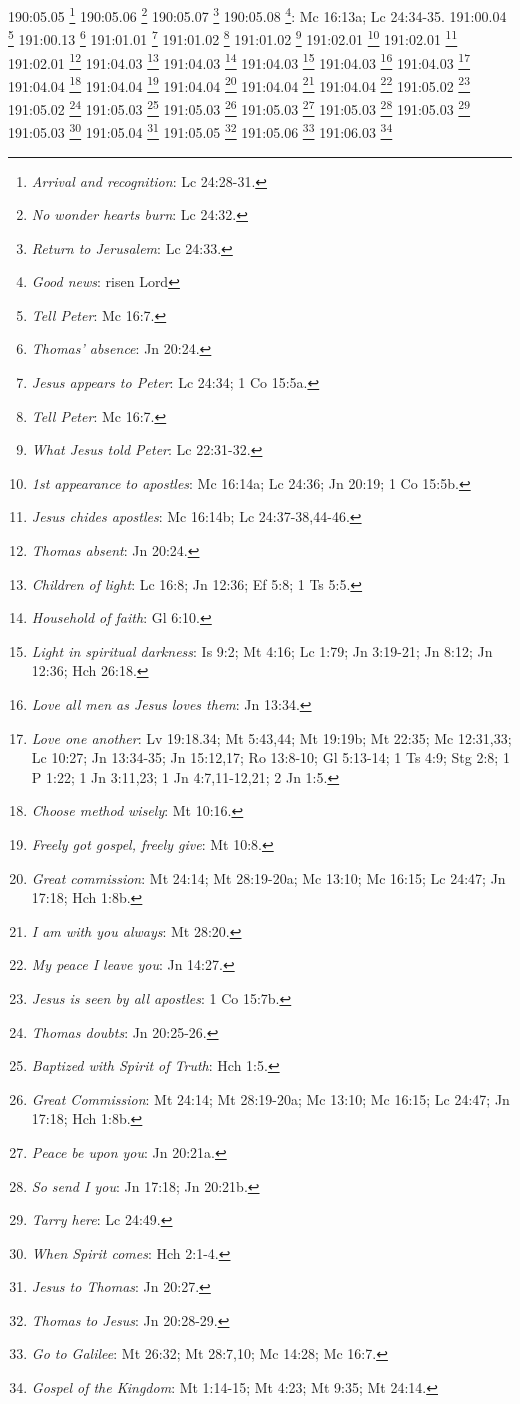 {{{{{{{{{{{{{{{{{{{{{{{{{{{{{{{{{{{{{{{{{{{{{{{{{{{{{{{{{{{{{{{{{{{{{{{{{{{{{{{{{{{{{{{{{{{{{{{{190:05.05 \footnote{\textit{Arrival and recognition}: Lc 24:28-31.}
190:05.06 \footnote{\textit{No wonder hearts burn}: Lc 24:32.}
190:05.07 \footnote{\textit{Return to Jerusalem}: Lc 24:33.}
190:05.08 \footnote{\textit{Good news}: risen Lord}: Mc 16:13a; Lc 24:34-35.}
191:00.04 \footnote{\textit{Tell Peter}: Mc 16:7.}
191:00.13 \footnote{\textit{Thomas' absence}: Jn 20:24.}
191:01.01 \footnote{\textit{Jesus appears to Peter}: Lc 24:34; 1 Co 15:5a.}
191:01.02 \footnote{\textit{Tell Peter}: Mc 16:7.}
191:01.02 \footnote{\textit{What Jesus told Peter}: Lc 22:31-32.}
191:02.01 \footnote{\textit{1st appearance to apostles}: Mc 16:14a; Lc 24:36; Jn 20:19; 1 Co 15:5b.}
191:02.01 \footnote{\textit{Jesus chides apostles}: Mc 16:14b; Lc 24:37-38,44-46.}
191:02.01 \footnote{\textit{Thomas absent}: Jn 20:24.}
191:04.03 \footnote{\textit{Children of light}: Lc 16:8; Jn 12:36; Ef 5:8; 1 Ts 5:5.}
191:04.03 \footnote{\textit{Household of faith}: Gl 6:10.}
191:04.03 \footnote{\textit{Light in spiritual darkness}: Is 9:2; Mt 4:16; Lc 1:79; Jn 3:19-21; Jn 8:12; Jn 12:36; Hch 26:18.}
191:04.03 \footnote{\textit{Love all men as Jesus loves them}: Jn 13:34.}
191:04.03 \footnote{\textit{Love one another}: Lv 19:18.34; Mt 5:43,44; Mt 19:19b; Mt 22:35; Mc 12:31,33; Lc 10:27; Jn 13:34-35; Jn 15:12,17; Ro 13:8-10; Gl 5:13-14; 1 Ts 4:9; Stg 2:8; 1 P 1:22; 1 Jn 3:11,23; 1 Jn 4:7,11-12,21; 2 Jn 1:5.}
191:04.04 \footnote{\textit{Choose method wisely}: Mt 10:16.}
191:04.04 \footnote{\textit{Freely got gospel, freely give}: Mt 10:8.}
191:04.04 \footnote{\textit{Great commission}: Mt 24:14; Mt 28:19-20a; Mc 13:10; Mc 16:15; Lc 24:47; Jn 17:18; Hch 1:8b.}
191:04.04 \footnote{\textit{I am with you always}: Mt 28:20.}
191:04.04 \footnote{\textit{My peace I leave you}: Jn 14:27.}
191:05.02 \footnote{\textit{Jesus is seen by all apostles}: 1 Co 15:7b.}
191:05.02 \footnote{\textit{Thomas doubts}: Jn 20:25-26.}
191:05.03 \footnote{\textit{Baptized with Spirit of Truth}: Hch 1:5.}
191:05.03 \footnote{\textit{Great Commission}: Mt 24:14; Mt 28:19-20a; Mc 13:10; Mc 16:15; Lc 24:47; Jn 17:18; Hch 1:8b.}
191:05.03 \footnote{\textit{Peace be upon you}: Jn 20:21a.}
191:05.03 \footnote{\textit{So send I you}: Jn 17:18; Jn 20:21b.}
191:05.03 \footnote{\textit{Tarry here}: Lc 24:49.}
191:05.03 \footnote{\textit{When Spirit comes}: Hch 2:1-4.}
191:05.04 \footnote{\textit{Jesus to Thomas}: Jn 20:27.}
191:05.05 \footnote{\textit{Thomas to Jesus}: Jn 20:28-29.}
191:05.06 \footnote{\textit{Go to Galilee}: Mt 26:32; Mt 28:7,10; Mc 14:28; Mc 16:7.}
191:06.03 \footnote{\textit{Gospel of the Kingdom}: Mt 1:14-15; Mt 4:23; Mt 9:35; Mt 24:14.}
}}}}}}}}}}}}}}}}}}}}}}}}}}}}}}}}}}}}}}}}}}}}}}}}}}}}}}}}}}}}}}}}}}}}}}}}}}}}}}}}}}}}}}}}}}}}}}}
